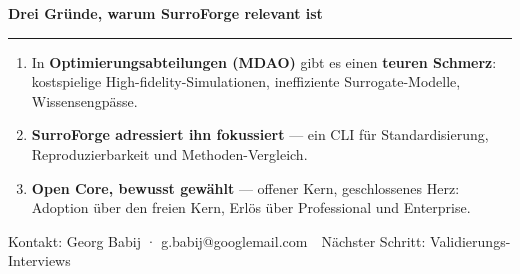 \documentclass[aspectratio=169,11pt]{beamer}
\begin{document}
{%
\begin{frame}[t]
  \vspace{0.3em}
  {\hspace{0.3cm}\rmfamily\bfseries\color{sfpaper}\large Drei Gründe, warum SurroForge relevant ist}\\[2pt]
  {\hspace{0.32cm}\color{sfaccent}\rule{1.5em}{2.2pt}}
  \vspace{0.4em}

  \hspace{0.3cm}\begin{minipage}{0.93\textwidth}
  \color{sfpaper}\small
  \begin{enumerate}\setlength\itemsep{0.3em}
    \item In \textbf{Optimierungsabteilungen (MDAO)} gibt es einen \textbf{teuren
          Schmerz}: kostspielige High-fidelity-Simulationen, ineffiziente
          Surrogate-Modelle, Wissensengpässe.
    \item \textbf{SurroForge adressiert ihn fokussiert} — ein CLI für
          Standardisierung, Reproduzierbarkeit und Methoden-Vergleich.
    \item \textbf{Open Core, bewusst gewählt} — offener Kern, geschlossenes Herz:
          Adoption über den freien Kern, Erlös über Professional und Enterprise.
  \end{enumerate}
  \end{minipage}

  \vfill
  {\hspace{0.32cm}\color{sfmute}\footnotesize Kontakt: Georg Babij · g.babij@googlemail.com\ \textbar\ Nächster Schritt: Validierungs-Interviews}
  \vspace{0.4em}
\end{frame}
}
\end{document}
